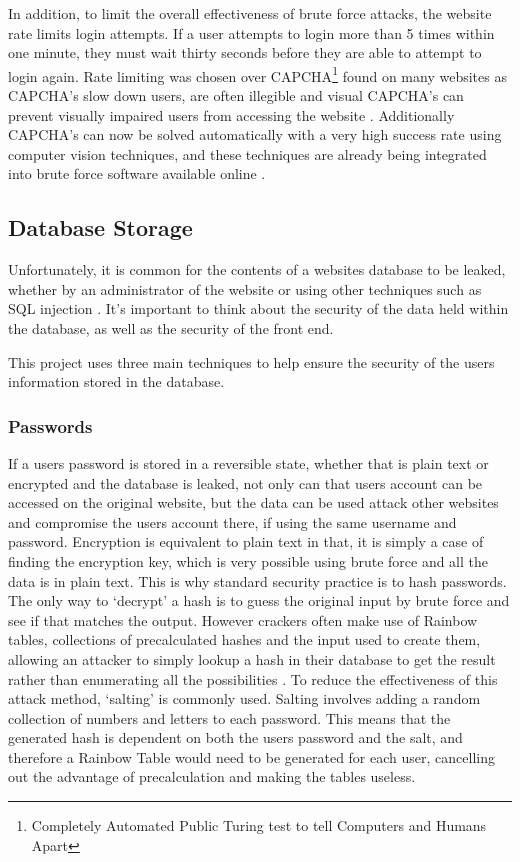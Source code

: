 In addition, to limit the overall effectiveness of brute force attacks, the website rate limits login attempts. If a user attempts to login more than 5 times within one minute, they must wait thirty seconds before they are able to attempt to login again.
%
Rate limiting was chosen over CAPCHA\footnote{Completely Automated Public Turing test to tell Computers and Humans Apart} found on many websites as CAPCHA's slow down users, are often illegible and visual CAPCHA's can prevent visually impaired users from accessing the website \parencite{matt2005inaccessibility, hegarty2012onlinesecurity}. Additionally CAPCHA's can now be solved automatically with a very high success rate using computer vision techniques, and these techniques are already being integrated into brute force software available online \parencite{goodfellow2013neuralnetwork, 9kweu2014captchasolver, danchev2014captcha, savinkin2012captchasolvers}. 

\subsection{Database Storage}
Unfortunately, it is common for the contents of a websites database to be leaked, whether by an administrator of the website or using other techniques such as SQL injection \parencite{bbc2012linkedinpasswords,chechik2013passwords}. It's important to think about the security of the data held within the database, as well as the security of the front end.

This project uses three main techniques to help ensure the security of the users information stored in the database.

\subsubsection{Passwords}
If a users password is stored in a reversible state, whether that is plain text or encrypted and the database is leaked, not only can that users account can be accessed on the original website, but the data can be used attack other websites and compromise the users account there, if using the same username and password.
%
Encryption is equivalent to plain text in that, it is simply a case of finding the encryption key, which is very possible using brute force and all the data is in plain text. 
%
This is why standard security practice is to hash passwords. The only way to `decrypt' a hash is to guess the original input by brute force and see if that matches the output.
%
However crackers often make use of Rainbow tables, collections of precalculated hashes and the input used to create them, allowing an attacker to simply lookup a hash in their database to get the result rather than enumerating all the possibilities \parencite{jorgensen2012}.
%
To reduce the effectiveness of this attack method, `salting' is commonly used. Salting involves adding a random collection of numbers and letters to each password. This means that the generated hash is dependent on both the users password and the salt, and therefore a Rainbow Table would need to be generated for each user, cancelling out the advantage of precalculation and making the tables useless.

